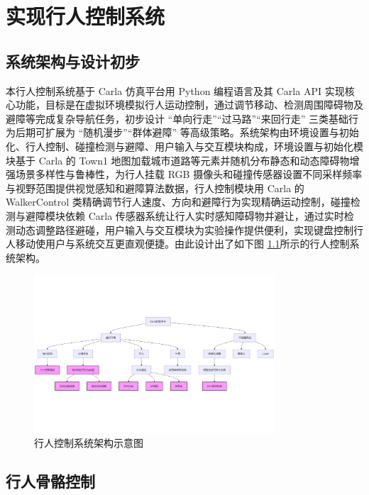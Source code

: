 \chapter{实现行人控制系统}

\section{系统架构与设计初步}

本行人控制系统基于 Carla 仿真平台用 Python 编程语言及其 Carla API 实现核心功能，目标是在虚拟环境模拟行人运动控制，通过调节移动、检测周围障碍物及避障等完成复杂导航任务，初步设计 “单向行走”“过马路”“来回行走” 三类基础行为后期可扩展为 “随机漫步”“群体避障” 等高级策略。系统架构由环境设置与初始化、行人控制、碰撞检测与避障、用户输入与交互模块构成，环境设置与初始化模块基于 Carla 的 Town1 地图加载城市道路等元素并随机分布静态和动态障碍物增强场景多样性与鲁棒性，为行人挂载 RGB 摄像头和碰撞传感器设置不同采样频率与视野范围提供视觉感知和避障算法数据，行人控制模块用 Carla 的 WalkerControl 类精确调节行人速度、方向和避障行为实现精确运动控制，碰撞检测与避障模块依赖 Carla 传感器系统让行人实时感知障碍物并避让，通过实时检测动态调整路径避碰，用户输入与交互模块为实验操作提供便利，实现键盘控制行人移动使用户与系统交互更直观便捷。由此设计出了如下图 \ref{fig:system_architecture}所示的行人控制系统架构。

\begin{figure}[H]
    \centering
    \includegraphics[width=0.8\textwidth]{images/system_architecture.pdf}
    \caption{行人控制系统架构示意图}
    \label{fig:system_architecture}
\end{figure}

\section{行人骨骼控制}

